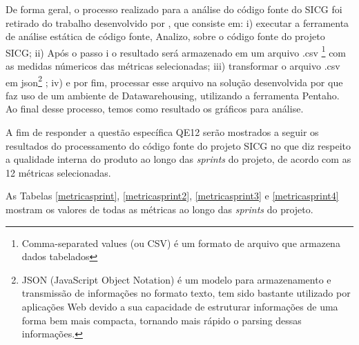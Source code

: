 De forma geral, o processo realizado para a análise do código fonte do SICG foi retirado do trabalho desenvolvido por , que  consiste em: i) executar a ferramenta de análise estática de código fonte, Analizo, sobre o código fonte do projeto SICG; ii) Após o passo i o resultado será armazenado em um arquivo .csv \footnote{Comma-separated values (ou CSV) é um formato de arquivo que armazena dados tabelados} com as medidas númericos das métricas selecionadas; iii) transformar o arquivo .csv em json\footnote{JSON (JavaScript Object Notation) é um modelo para armazenamento e transmissão de informações no formato texto, tem sido bastante utilizado por aplicações Web devido a sua capacidade de estruturar informações de uma forma bem mais compacta, tornando mais rápido o parsing dessas informações.} ; iv) e por fim, processar esse arquivo na solução desenvolvida por  que faz uso de um ambiente de Datawarehousing, utilizando a ferramenta Pentaho. Ao final desse processo, temos como resultado os gráficos para análise. 

A fim de responder a questão específica QE12 serão mostrados a seguir os resultados do processamento do código fonte do projeto SICG no que diz respeito a qualidade interna do produto ao longo das \textit{sprints} do projeto, de acordo com as 12 métricas selecionadas.

As Tabelas \ref{metricasprint}, \ref{metricasprint2}, \ref{metricasprint3} e \ref{metricasprint4} mostram os valores de todas as métricas ao longo das \textit{sprints} do projeto.


